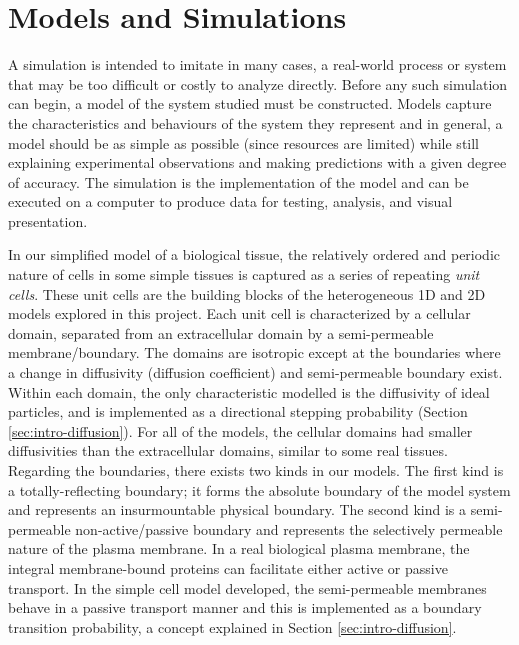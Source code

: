 \chapter{Models and Simulations}
\label{chapter:mods-sims}
	
	A simulation is intended to imitate in many cases, a real-world process or system that may be too difficult or costly to analyze directly. Before any such simulation can begin, a model of the system studied must be constructed. Models capture the characteristics and behaviours of the system they represent and in general, a model should be as simple as possible (since resources are limited) while still explaining experimental observations and making predictions with a given degree of accuracy. The simulation is the implementation of the model and can be executed on a computer to produce data for testing, analysis, and visual presentation.

	In our simplified model of a biological tissue, the relatively ordered and periodic nature of cells in some simple tissues is captured as a series of repeating \textsl{unit cells}. These unit cells are the building blocks of the heterogeneous 1D and 2D models explored in this project. Each unit cell is characterized by a cellular domain, separated from an extracellular domain by a semi-permeable membrane/boundary. The domains are isotropic except at the boundaries where a change in diffusivity (diffusion coefficient) and semi-permeable boundary exist. Within each domain, the only characteristic modelled is the diffusivity of ideal particles, and is implemented as a directional stepping probability (Section \ref{sec:intro-diffusion}). For all of the models, the cellular domains had smaller diffusivities than the extracellular domains, similar to some real tissues. Regarding the boundaries, there exists two kinds in our models. The first kind is a totally-reflecting boundary; it forms the absolute boundary of the model system and represents an insurmountable physical boundary. The second kind is a semi-permeable non-active/passive boundary and represents the selectively permeable nature of the plasma membrane. In a real biological plasma membrane, the integral membrane-bound proteins can facilitate either active or passive transport. In the simple cell model developed, the semi-permeable membranes behave in a passive transport manner and this is implemented as a boundary transition probability, a concept explained in Section \ref{sec:intro-diffusion}.
	
